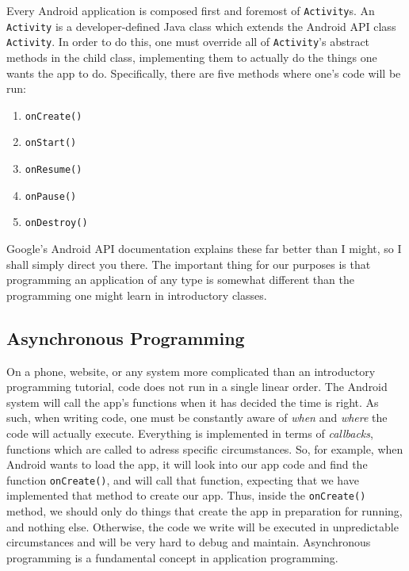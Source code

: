 Every Android application is composed first and foremost of \verb|Activity|s. An \verb|Activity| is a developer-defined Java class which extends the 
Android API class \verb|Activity|. In order to do this, one must override all of \verb|Activity|'s abstract methods in the child class, implementing them
to actually do the things one wants the app to do. Specifically, there are five methods where one's code will be run:

\begin{enumerate}
\item{\verb|onCreate()|}
\item{\verb|onStart()|}
\item{\verb|onResume()|}
\item{\verb|onPause()|}
\item{\verb|onDestroy()|}
\end{enumerate}

Google's Android API documentation explains these far better than I might, so I shall simply direct you there. The important thing for our
purposes is that programming an application of any type is somewhat different than the programming one might learn in introductory classes.

\subsection{Asynchronous Programming}
On a phone, website, or any system more complicated than an introductory programming tutorial, code does not run in a single linear order.
The Android system will call the app's functions when it has decided the time is right. As such, when writing code, one must be constantly
aware of \emph{when} and \emph{where} the code will actually execute. Everything is implemented in terms of \emph{callbacks}, functions which
are called to adress specific circumstances. So, for example, when Android wants to load the app, it will look into our app code and find
the function \verb|onCreate()|, and will call that function, expecting that we have implemented that method to create our app. Thus, inside
the \verb|onCreate()| method, we should only do things that create the app in preparation for running, and nothing else. Otherwise, 
the code we write will be executed in unpredictable circumstances and will be very hard to debug and maintain. Asynchronous programming is
a fundamental concept in application programming. 

